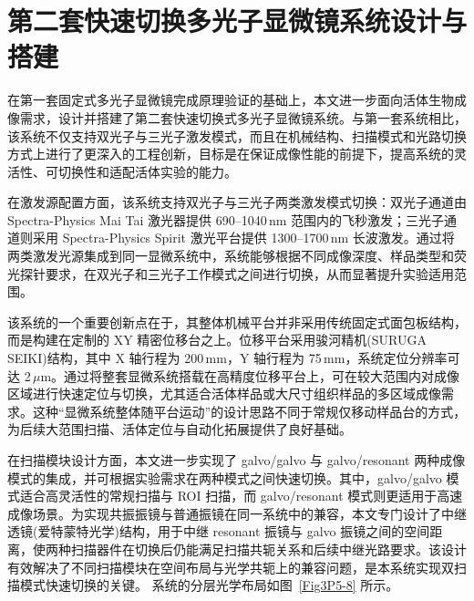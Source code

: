 \section{第二套快速切换多光子显微镜系统设计与搭建}\label{4.3}

在第一套固定式多光子显微镜完成原理验证的基础上，本文进一步面向活体生物成像需求，设计并搭建了第二套快速切换式多光子显微镜系统。与第一套系统相比，该系统不仅支持双光子与三光子激发模式，而且在机械结构、扫描模式和光路切换方式上进行了更深入的工程创新，目标是在保证成像性能的前提下，提高系统的灵活性、可切换性和适配活体实验的能力。

在激发源配置方面，该系统支持双光子与三光子两类激发模式切换：双光子通道由 Spectra-Physics Mai Tai 激光器提供 690--1040\,nm 范围内的飞秒激发；三光子通道则采用 Spectra-Physics Spirit 激光平台提供 1300--1700\,nm 长波激发。通过将两类激发光源集成到同一显微系统中，系统能够根据不同成像深度、样品类型和荧光探针要求，在双光子和三光子工作模式之间进行切换，从而显著提升实验适用范围。

该系统的一个重要创新点在于，其整体机械平台并非采用传统固定式面包板结构，而是构建在定制的 XY 精密位移台之上。位移平台采用骏河精机(SURUGA SEIKI)结构，其中 X 轴行程为 200\,mm，Y 轴行程为 75\,mm，系统定位分辨率可达 2\,$\mu$m。通过将整套显微系统搭载在高精度位移平台上，可在较大范围内对成像区域进行快速定位与切换，尤其适合活体样品或大尺寸组织样品的多区域成像需求。这种``显微系统整体随平台运动''的设计思路不同于常规仅移动样品台的方式，为后续大范围扫描、活体定位与自动化拓展提供了良好基础。

在扫描模块设计方面，本文进一步实现了 galvo/galvo 与 galvo/resonant 两种成像模式的集成，并可根据实验需求在两种模式之间快速切换。其中，galvo/galvo 模式适合高灵活性的常规扫描与 ROI 扫描，而 galvo/resonant 模式则更适用于高速成像场景。为实现共振振镜与普通振镜在同一系统中的兼容，本文专门设计了中继透镜(爱特蒙特光学)结构，用于中继 resonant 振镜与 galvo 振镜之间的空间距离，使两种扫描器件在切换后仍能满足扫描共轭关系和后续中继光路要求。该设计有效解决了不同扫描模块在空间布局与光学共轭上的兼容问题，是本系统实现双扫描模式快速切换的关键。
系统的分层光学布局如图~\ref{Fig3P5-8} 所示。

